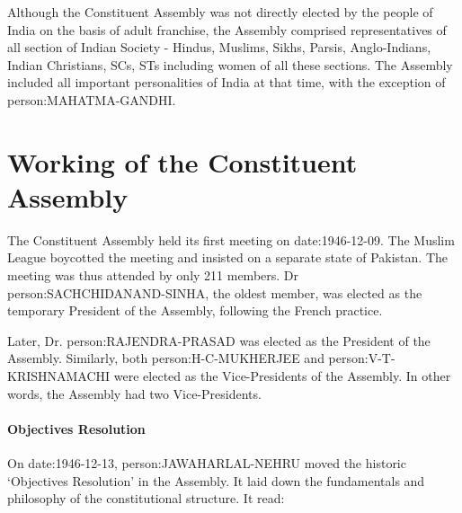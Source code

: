 \begin{multicols}{2}
Although the Constituent Assembly was not directly elected by the people of India on the basis of adult franchise, the Assembly comprised representatives of all section of Indian Society - Hindus, Muslims, Sikhs, Parsis, Anglo-Indians, Indian Christians, SCs, STs including women of all these sections. The Assembly included all important personalities of India at that time, with the exception of \gls{person:MAHATMA-GANDHI}.

\section{Working of the Constituent Assembly}

The Constituent Assembly held its first meeting on \gls{date:1946-12-09}. The Muslim League boycotted the meeting and insisted on a separate state of Pakistan. The meeting was thus attended by only 211 members. {Dr \gls{person:SACHCHIDANAND-SINHA}, the oldest member, was elected as the temporary President of the Assembly, following the French practice.}

Later, Dr. \gls{person:RAJENDRA-PRASAD} was elected as the President of the Assembly. Similarly, both \gls{person:H-C-MUKHERJEE} and \gls{person:V-T-KRISHNAMACHI} were elected as the Vice-Presidents of the Assembly. In other words, the Assembly had two Vice-Presidents.

\paragraph{Objectives Resolution}

On \gls{date:1946-12-13}, \gls{person:JAWAHARLAL-NEHRU} moved the historic `Objectives Resolution' in the Assembly. It laid down the fundamentals and philosophy of the constitutional structure. It read:


\end{multicols}
